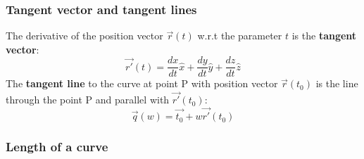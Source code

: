 \documentclass[11pt]{article}
\begin{document}
    \subsubsection{Tangent vector and tangent lines}
    The derivative of the position vector $\vec{r}(t)$ w.r.t the parameter $t$ is the \textbf{tangent vector}:
    \begin{equation}
        \label{eq:equation7}
        \vec{r'}(t) = \frac{dx}{dt}\hat{x} + \frac{dy}{dt}\hat{y} + \frac{dz}{dt}\hat{z}

    \end{equation}
    The \textbf{tangent line} to the curve at point P with position vector $\vec{r}(t_0)$ is the line
    through the point P and parallel with $\vec{r'}(t_0)$:
    \begin{equation}
        \label{eq:equation8}
        \vec{q}(w) = \vec{t_0} + w\vec{r'}(t_0)
    \end{equation}
    \subsubsection{Length of a curve}
\end{document}
